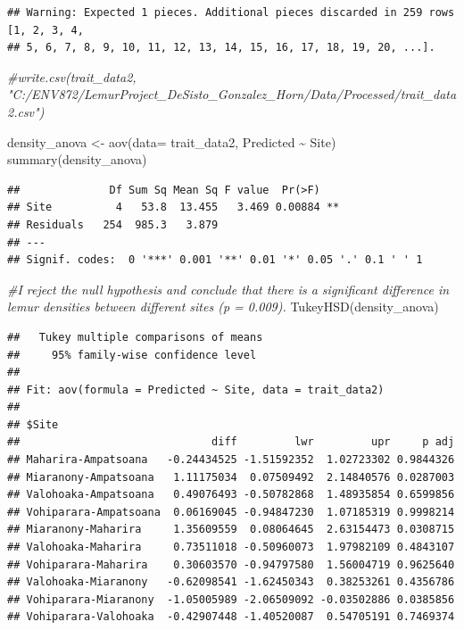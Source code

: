\documentclass[
  12pt,
]{article}
\newenvironment{Shaded}{\begin{snugshade}}{\end{snugshade}}
\newcommand{\AttributeTok}[1]{\textcolor[rgb]{0.77,0.63,0.00}{#1}}
\newcommand{\CommentTok}[1]{\textcolor[rgb]{0.56,0.35,0.01}{\textit{#1}}}
\newcommand{\FunctionTok}[1]{\textcolor[rgb]{0.00,0.00,0.00}{#1}}
\newcommand{\NormalTok}[1]{#1}
\newcommand{\OtherTok}[1]{\textcolor[rgb]{0.56,0.35,0.01}{#1}}
\newcommand{\SpecialCharTok}[1]{\textcolor[rgb]{0.00,0.00,0.00}{#1}}
\begin{document}
\begin{verbatim}
## Warning: Expected 1 pieces. Additional pieces discarded in 259 rows [1, 2, 3, 4,
## 5, 6, 7, 8, 9, 10, 11, 12, 13, 14, 15, 16, 17, 18, 19, 20, ...].
\end{verbatim}

\begin{Shaded}
\begin{Highlighting}[]
\CommentTok{\#write.csv(trait\_data2, "C:/ENV872/LemurProject\_DeSisto\_Gonzalez\_Horn/Data/Processed/trait\_data2.csv")}


\NormalTok{density\_anova }\OtherTok{\textless{}{-}} \FunctionTok{aov}\NormalTok{(}\AttributeTok{data=}\NormalTok{ trait\_data2, Predicted }\SpecialCharTok{\textasciitilde{}}\NormalTok{ Site)}
\FunctionTok{summary}\NormalTok{(density\_anova)}
\end{Highlighting}
\end{Shaded}

\begin{verbatim}
##              Df Sum Sq Mean Sq F value  Pr(>F)   
## Site          4   53.8  13.455   3.469 0.00884 **
## Residuals   254  985.3   3.879                   
## ---
## Signif. codes:  0 '***' 0.001 '**' 0.01 '*' 0.05 '.' 0.1 ' ' 1
\end{verbatim}

\begin{Shaded}
\begin{Highlighting}[]
\CommentTok{\#I reject the null hypothesis and conclude that there is a significant difference in lemur densities between different sites (p = 0.009). }
\FunctionTok{TukeyHSD}\NormalTok{(density\_anova)}
\end{Highlighting}
\end{Shaded}

\begin{verbatim}
##   Tukey multiple comparisons of means
##     95% family-wise confidence level
## 
## Fit: aov(formula = Predicted ~ Site, data = trait_data2)
## 
## $Site
##                              diff         lwr         upr     p adj
## Maharira-Ampatsoana   -0.24434525 -1.51592352  1.02723302 0.9844326
## Miaranony-Ampatsoana   1.11175034  0.07509492  2.14840576 0.0287003
## Valohoaka-Ampatsoana   0.49076493 -0.50782868  1.48935854 0.6599856
## Vohiparara-Ampatsoana  0.06169045 -0.94847230  1.07185319 0.9998214
## Miaranony-Maharira     1.35609559  0.08064645  2.63154473 0.0308715
## Valohoaka-Maharira     0.73511018 -0.50960073  1.97982109 0.4843107
## Vohiparara-Maharira    0.30603570 -0.94797580  1.56004719 0.9625640
## Valohoaka-Miaranony   -0.62098541 -1.62450343  0.38253261 0.4356786
## Vohiparara-Miaranony  -1.05005989 -2.06509092 -0.03502886 0.0385856
## Vohiparara-Valohoaka  -0.42907448 -1.40520087  0.54705191 0.7469374
\end{verbatim}
\end{document}
